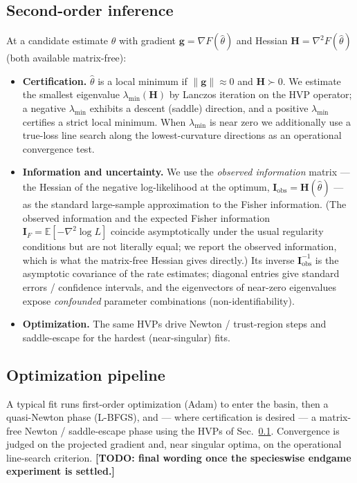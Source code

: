 \documentclass[11pt]{article}
\newcommand{\TODO}[1]{{\color{red!70!black}\textbf{[TODO: #1]}}}
\newcommand{\Hess}{\mathbf{H}}
\newcommand{\Fish}{\mathbf{I}}
\newcommand{\grad}{\mathbf{g}}
\begin{document}
\subsection{Second-order inference}
\label{sec:second}
At a candidate estimate $\hat\theta$ with gradient $\grad=\nabla F(\hat\theta)$
and Hessian $\Hess=\nabla^2 F(\hat\theta)$ (both available matrix-free):
\begin{itemize}[leftmargin=1.4em,itemsep=2pt]
\item \textbf{Certification.} $\hat\theta$ is a local minimum if
$\|\grad\|\approx 0$ and $\Hess\succ 0$. We estimate the smallest eigenvalue
$\lambda_{\min}(\Hess)$ by Lanczos iteration on the HVP operator; a negative
$\lambda_{\min}$ exhibits a descent (saddle) direction, and a positive
$\lambda_{\min}$ certifies a strict local minimum. When $\lambda_{\min}$ is
near zero we additionally use a true-loss line search along the lowest-curvature
directions as an operational convergence test.
\item \textbf{Information and uncertainty.} We use the \emph{observed
information} matrix --- the Hessian of the negative log-likelihood at the
optimum, $\Fish_{\mathrm{obs}} = \Hess(\hat\theta)$ --- as the standard
large-sample approximation to the Fisher information. (The observed information
and the expected Fisher information $\Fish_F = \mathbb{E}[-\nabla^2\log L]$
coincide asymptotically under the usual regularity conditions but are not
literally equal; we report the observed information, which is what the
matrix-free Hessian gives directly.) Its inverse $\Fish_{\mathrm{obs}}^{-1}$ is
the asymptotic covariance of the rate estimates; diagonal entries give standard
errors / confidence intervals, and the eigenvectors of near-zero eigenvalues
expose \emph{confounded} parameter combinations (non-identifiability).
\item \textbf{Optimization.} The same HVPs drive Newton / trust-region steps
and saddle-escape for the hardest (near-singular) fits.
\end{itemize}

\subsection{Optimization pipeline}
\label{sec:pipeline}
A typical fit runs first-order optimization (Adam) to enter the basin, then a
quasi-Newton phase (L-BFGS), and --- where certification is desired --- a
matrix-free Newton / saddle-escape phase using the HVPs of
Sec.~\ref{sec:second}. Convergence is judged on the projected gradient and,
near singular optima, on the operational line-search criterion.
\TODO{final wording once the specieswise endgame experiment is settled.}
\end{document}
